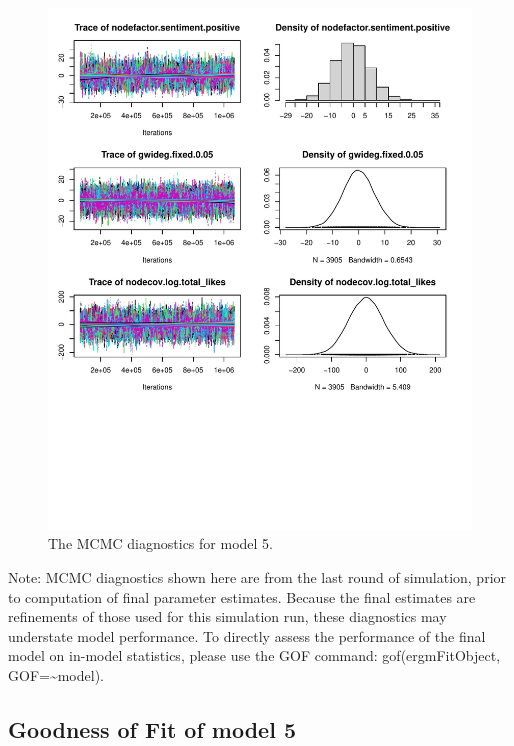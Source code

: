 \documentclass[
  man,floatsintext]{apa6}
\begin{document}
\begin{figure}[H]

{\centering \includegraphics{SNA4DS_Report_files/figure-latex/mcmc-diagnostics-2} 

}

\caption{The MCMC diagnostics for model 5.}\label{fig:mcmc-diagnostics-2}
\end{figure}

Note: MCMC diagnostics shown here are from the last round of
simulation, prior to computation of final parameter estimates.
Because the final estimates are refinements of those used for this
simulation run, these diagnostics may understate model performance.
To directly assess the performance of the final model on in-model
statistics, please use the GOF command: gof(ergmFitObject,
GOF=\textasciitilde model).
\newpage

\subsection{\texorpdfstring{Goodness of Fit of model 5\\
}{Goodness of Fit of model 5 }}\label{goodness-of-fit-of-model-5}
\end{document}
